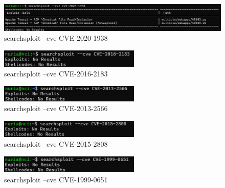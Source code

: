 \documentclass[a4paper,12pt]{article} %
\begin{document}
            \begin{figure} [hp!]
             \centering
             \includegraphics[width=1\textwidth]{imagenes/cvelinux3.png}
             \caption{ searchsploit --cve CVE-2020-1938}
             \label{fig:linux3}
            \end{figure}

            \begin{figure} [hp!]
             \centering
             \includegraphics[width=0.6\textwidth]{imagenes/cvelinux4.png}
             \caption{ searchsploit --cve CVE-2016-2183}
             \label{fig:linux4}
            \end{figure}
        
            \begin{figure} [hp!]
             \centering
             \includegraphics[width=0.6\textwidth]{imagenes/cvelinux5.png}
             \caption{ searchsploit --cve CVE-2013-2566}
             \label{fig:linux5}
            \end{figure}

            \begin{figure} [hp!]
             \centering
             \includegraphics[width=0.6\textwidth]{imagenes/cvelinux6.png}
             \caption{ searchsploit --cve CVE-2015-2808}
             \label{fig:linux6}
            \end{figure}

            \begin{figure} [hp!]
             \centering
             \includegraphics[width=0.6\textwidth]{imagenes/cvelinux7.png}
             \caption{ searchsploit --cve CVE-1999-0651}
             \label{fig:linux7}
            \end{figure}
\end{document}
